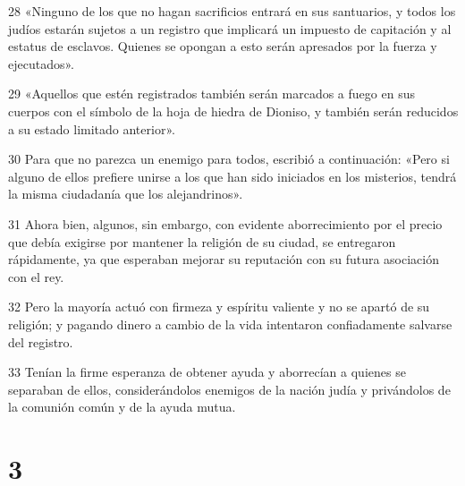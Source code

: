 \par 28 «Ninguno de los que no hagan sacrificios entrará en sus santuarios, y todos los judíos estarán sujetos a un registro que implicará un impuesto de capitación y al estatus de esclavos. Quienes se opongan a esto serán apresados ​​por la fuerza y ​​ejecutados».
\par 29 «Aquellos que estén registrados también serán marcados a fuego en sus cuerpos con el símbolo de la hoja de hiedra de Dioniso, y también serán reducidos a su estado limitado anterior».
\par 30 Para que no parezca un enemigo para todos, escribió a continuación: «Pero si alguno de ellos prefiere unirse a los que han sido iniciados en los misterios, tendrá la misma ciudadanía que los alejandrinos».
\par 31 Ahora bien, algunos, sin embargo, con evidente aborrecimiento por el precio que debía exigirse por mantener la religión de su ciudad, se entregaron rápidamente, ya que esperaban mejorar su reputación con su futura asociación con el rey.
\par 32 Pero la mayoría actuó con firmeza y espíritu valiente y no se apartó de su religión; y pagando dinero a cambio de la vida intentaron confiadamente salvarse del registro.
\par 33 Tenían la firme esperanza de obtener ayuda y aborrecían a quienes se separaban de ellos, considerándolos enemigos de la nación judía y privándolos de la comunión común y de la ayuda mutua.

\chapter{3}

